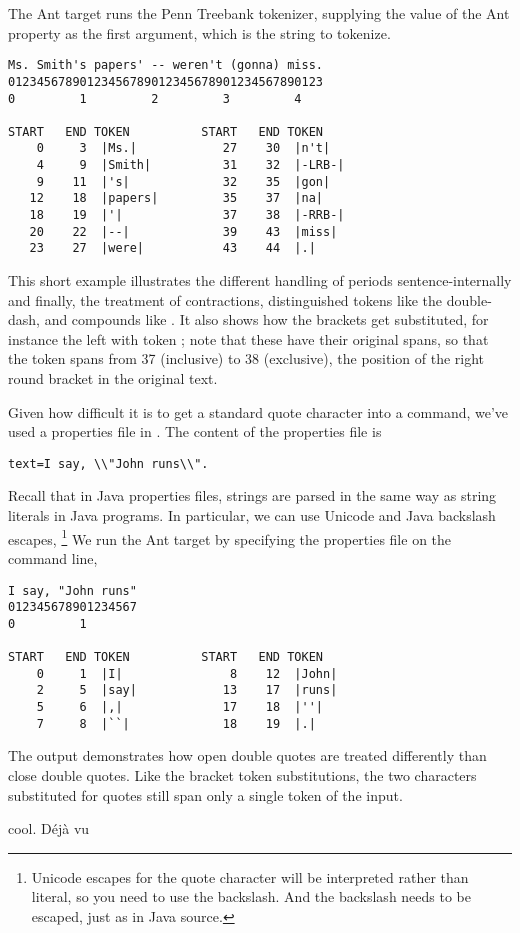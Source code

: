 The Ant target  runs the Penn Treebank tokenizer,
supplying the value of the Ant property  as the first
argument, which is the string to tokenize.
%
\begin{verbatim}
Ms. Smith's papers' -- weren't (gonna) miss.
01234567890123456789012345678901234567890123
0         1         2         3         4

START   END TOKEN          START   END TOKEN
    0     3  |Ms.|            27    30  |n't|
    4     9  |Smith|          31    32  |-LRB-|
    9    11  |'s|             32    35  |gon|
   12    18  |papers|         35    37  |na|
   18    19  |'|              37    38  |-RRB-|
   20    22  |--|             39    43  |miss|
   23    27  |were|           43    44  |.|
\end{verbatim}
%
This short example illustrates the different handling of periods
sentence-internally and finally, the treatment of contractions,
distinguished tokens like the double-dash, and compounds like
.  It also shows how the brackets get
substituted, for instance the left with token ;
note that these have their original spans, so that the
token  spans from 37 (inclusive) to 38 (exclusive),
the position of the right round bracket in the original text.

Given how difficult it is to get a standard quote character into a
command, we've used a properties file in
.  The content of the properties
file is 
%
\begin{verbatim}
text=I say, \\"John runs\\".
\end{verbatim}
%
Recall that in Java properties files, strings are parsed in the same
way as string literals in Java programs.  In particular, we can use
Unicode and Java backslash escapes,%
%
\footnote{Unicode escapes for the quote character will be interpreted
rather than literal, so you need to use the backslash.  And the
backslash needs to be escaped, just as in Java source.}
%
We run the Ant target by specifying the properties file on the
command line,
%
\begin{verbatim}
I say, "John runs"
012345678901234567
0         1

START   END TOKEN          START   END TOKEN
    0     1  |I|               8    12  |John|
    2     5  |say|            13    17  |runs|
    5     6  |,|              17    18  |''|
    7     8  |``|             18    19  |.|
\end{verbatim}
%
The output demonstrates how open double quotes are treated differently
than close double quotes.  Like the bracket token substitutions,
the two characters substituted for quotes still span only a single token
of the input.



cool.  
Déjà vu
